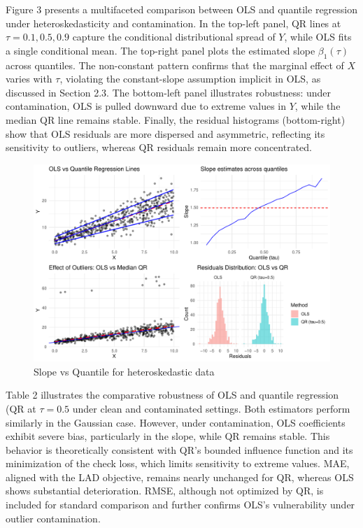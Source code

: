 \documentclass[fleqn,10pt]{latex/stylish_article} %
\begin{document}
Figure 3 presents a multifaceted comparison between OLS and quantile regression under heteroskedasticity and contamination. In the top-left panel, QR lines at \(\tau = 0.1, 0.5, 0.9\) capture the conditional distributional spread of \(Y\), while OLS fits a single conditional mean. The top-right panel plots the estimated slope \(\beta_1(\tau)\) across quantiles. The non-constant pattern confirms that the marginal effect of \(X\) varies with \(\tau\), violating the constant-slope assumption implicit in OLS, as discussed in Section 2.3. The bottom-left panel illustrates robustness: under contamination, OLS is pulled downward due to extreme values in \(Y\), while the median QR line remains stable. Finally, the residual histograms (bottom-right) show that OLS residuals are more dispersed and asymmetric, reflecting its sensitivity to outliers, whereas QR residuals remain more concentrated.

\begin{figure}

{\centering \includegraphics[width=0.8\linewidth]{ADR_project_draft_files/figure-latex/unnamed-chunk-5-1} 

}

\caption{Slope vs Quantile for heteroskedastic data}\label{fig:unnamed-chunk-5}
\end{figure}

Table 2 illustrates the comparative robustness of OLS and quantile regression (QR at \(\tau = 0.5\) under clean and contaminated settings. Both estimators perform similarly in the Gaussian case. However, under contamination, OLS coefficients exhibit severe bias, particularly in the slope, while QR remains stable. This behavior is theoretically consistent with QR's bounded influence function and its minimization of the check loss, which limits sensitivity to extreme values. MAE, aligned with the LAD objective, remains nearly unchanged for QR, whereas OLS shows substantial deterioration. RMSE, although not optimized by QR, is included for standard comparison and further confirms OLS's vulnerability under outlier contamination.
\end{document}
